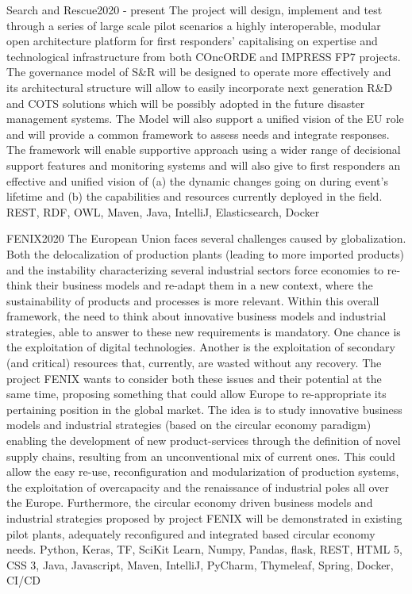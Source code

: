 \begin{projects}
	\newpage

	\project
	{Search and Rescue}{2020 - present}
	{}
	{The project will design, implement and test through a series of large scale pilot scenarios a highly interoperable, modular open architecture platform for first responders’ capitalising on expertise and technological infrastructure from both COncORDE and IMPRESS FP7 projects. The governance model of S\&R will be designed to operate more effectively and its architectural structure will allow to easily incorporate next generation R\&D and COTS solutions which will be possibly adopted in the future disaster management systems. The Model will also support a unified vision of the EU role and will provide a common framework to assess needs and integrate responses. The framework will enable supportive approach using a wider range of decisional support features and monitoring systems and will also give to first responders an effective and unified vision of (a) the dynamic changes going on during event's lifetime and (b) the capabilities and resources currently deployed in the field.}
	{REST, RDF, OWL, Maven, Java, IntelliJ, Elasticsearch, Docker}

	\project
	{FENIX}{2020}
	{}
	{The European Union faces several challenges caused by globalization. Both the delocalization of production plants (leading to more imported products) and the instability characterizing several industrial sectors force economies to re-think their business models and re-adapt them in a new context, where the sustainability of products and processes is more relevant. Within this overall framework, the need to think about innovative business models and industrial strategies, able to answer to these new requirements is mandatory. One chance is the exploitation of digital technologies. Another is the exploitation of secondary (and critical) resources that, currently, are wasted without any recovery. The project FENIX wants to consider both these issues and their potential at the same time, proposing something that could allow Europe to re-appropriate its pertaining position in the global market. The idea is to study innovative business models and industrial strategies (based on the circular economy paradigm) enabling the development of new product-services through the definition of novel supply chains, resulting from an unconventional mix of current ones. This could allow the easy re-use, reconfiguration and modularization of production systems, the exploitation of overcapacity and the renaissance of industrial poles all over the Europe. Furthermore, the circular economy driven business models and industrial strategies proposed by project FENIX will be demonstrated in existing pilot plants, adequately reconfigured and integrated based circular economy needs.}
	{Python, Keras, TF, SciKit Learn, Numpy, Pandas, flask, REST, HTML 5, CSS 3, Java, Javascript, Maven, IntelliJ, PyCharm, Thymeleaf, Spring, Docker, CI/CD}


\end{projects}
